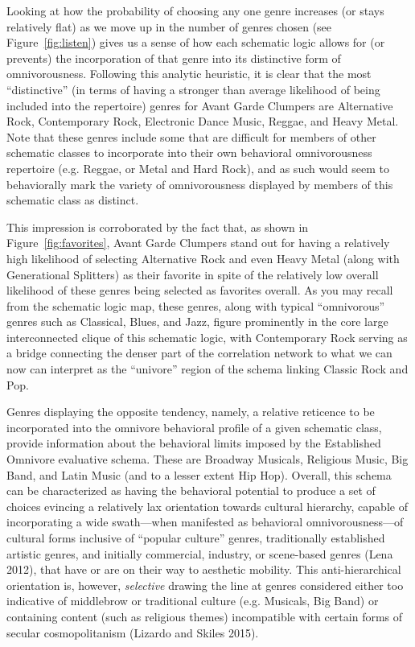 \documentclass[preprint,12pt]{elsarticle}
\begin{document}
Looking at how the probability of choosing any one genre increases (or stays relatively flat) as we move up in the number of genres chosen (see Figure~\ref{fig:listen}) gives us a sense of how each schematic logic allows for (or prevents) the incorporation of that genre into its distinctive form of omnivorousness. Following this analytic heuristic, it is clear that the most ``distinctive'' (in terms of having a stronger than average likelihood of being included into the repertoire) genres for Avant Garde Clumpers are Alternative Rock, Contemporary Rock, Electronic Dance Music, Reggae, and Heavy Metal. Note that these genres include some that are difficult for members of other schematic classes to incorporate into their own behavioral omnivorousness repertoire (e.g. Reggae, or Metal and Hard Rock), and as such would seem to behaviorally mark the variety of omnivorousness displayed by members of this schematic class as distinct. 

This impression is corroborated by the fact that, as shown in Figure~\ref{fig:favorites}, Avant Garde Clumpers stand out for having a relatively high likelihood of selecting Alternative Rock and even Heavy Metal (along with Generational Splitters) as their favorite in spite of the relatively low overall likelihood of these genres being selected as favorites overall. As you may recall from the schematic logic map, these genres, along with typical ``omnivorous'' genres such as Classical, Blues, and Jazz, figure prominently in the core large interconnected clique of this schematic logic, with Contemporary Rock serving as a bridge connecting the denser part of the correlation network to what we can now can interpret as the ``univore'' region of the schema linking Classic Rock and Pop. 

Genres displaying the opposite tendency, namely, a relative reticence to be incorporated into the omnivore behavioral profile of a given schematic class, provide information about the behavioral limits imposed by the Established Omnivore evaluative schema. These are Broadway Musicals, Religious Music, Big Band, and Latin Music (and to a lesser extent Hip Hop). Overall, this schema can be characterized as having the behavioral potential to produce a set of choices evincing a relatively lax orientation towards cultural hierarchy, capable of incorporating a wide swath---when manifested as behavioral omnivorousness---of cultural forms inclusive of ``popular culture'' genres, traditionally established artistic genres, and initially commercial, industry, or scene-based genres (Lena 2012), that have or are on their way to aesthetic mobility. This anti-hierarchical orientation is, however, \emph{selective} drawing the line at genres considered either too indicative of middlebrow or traditional culture (e.g. Musicals, Big Band) or containing content (such as religious themes) incompatible with certain forms of secular cosmopolitanism (Lizardo and Skiles 2015). 
\end{document}
